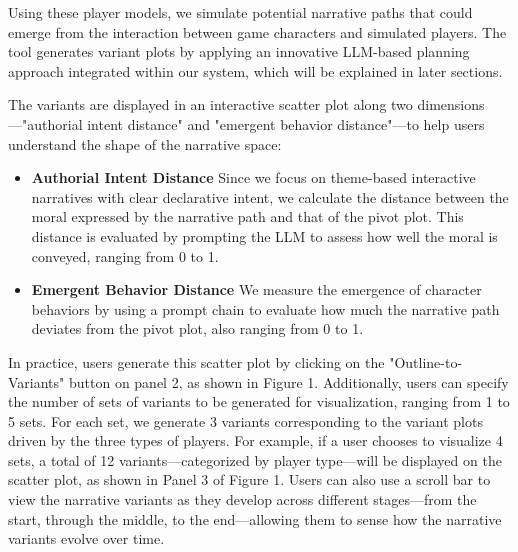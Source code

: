 Using these player models, we simulate potential narrative paths that could emerge from the interaction between game characters and simulated players. The tool generates variant plots by applying an innovative LLM-based planning approach integrated within our system, which will be explained in later sections.


The variants are displayed in an interactive scatter plot along two dimensions—"authorial intent distance" and "emergent behavior distance"—to help users understand the shape of the narrative space:
\begin{itemize}
    \item \textbf{Authorial Intent Distance} Since we focus on theme-based interactive narratives with clear declarative intent, we calculate the distance between the moral expressed by the narrative path and that of the pivot plot. This distance is evaluated by prompting the LLM to assess how well the moral is conveyed, ranging from 0 to 1.
    \item \textbf{Emergent Behavior Distance} We measure the emergence of character behaviors by using a prompt chain to evaluate how much the narrative path deviates from the pivot plot, also ranging from 0 to 1.
\end{itemize}

In practice, users generate this scatter plot by clicking on the "Outline-to-Variants" button on panel 2, as shown in Figure 1. Additionally, users can specify the number of sets of variants to be generated for visualization, ranging from 1 to 5 sets. For each set, we generate 3 variants corresponding to the variant plots driven by the three types of players. For example, if a user chooses to visualize 4 sets, a total of 12 variants—categorized by player type—will be displayed on the scatter plot, as shown in Panel 3 of Figure 1. Users can also use a scroll bar to view the narrative variants as they develop across different stages—from the start, through the middle, to the end—allowing them to sense how the narrative variants evolve over time.







